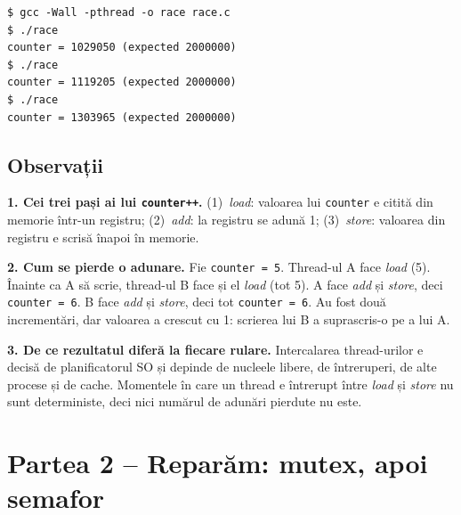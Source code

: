\documentclass[11pt,a4paper]{article}
\begin{document}
\begin{terminal}
\begin{verbatim}
$ gcc -Wall -pthread -o race race.c
$ ./race
counter = 1029050 (expected 2000000)
$ ./race
counter = 1119205 (expected 2000000)
$ ./race
counter = 1303965 (expected 2000000)
\end{verbatim}
\end{terminal}

\subsection*{Observații}
\begin{answer}
\textbf{1. Cei trei pași ai lui \texttt{counter++}.}
(1)~\emph{load}: valoarea lui \texttt{counter} e citită din memorie într-un registru;
(2)~\emph{add}: la registru se adună 1;
(3)~\emph{store}: valoarea din registru e scrisă înapoi în memorie.

\medskip
\textbf{2. Cum se pierde o adunare.} Fie \texttt{counter = 5}. Thread-ul A face \emph{load} (5). Înainte ca A să scrie,
thread-ul B face și el \emph{load} (tot 5). A face \emph{add} și \emph{store}, deci \texttt{counter = 6}. B face \emph{add}
și \emph{store}, deci tot \texttt{counter = 6}. Au fost două incrementări, dar valoarea a crescut cu 1: scrierea lui B a
suprascris-o pe a lui A.

\medskip
\textbf{3. De ce rezultatul diferă la fiecare rulare.} Intercalarea thread-urilor e decisă de planificatorul SO și
depinde de nucleele libere, de întreruperi, de alte procese și de cache. Momentele în care un thread e întrerupt între
\emph{load} și \emph{store} nu sunt deterministe, deci nici numărul de adunări pierdute nu este.
\end{answer}

\section{Partea 2 -- Reparăm: mutex, apoi semafor}
\end{document}
